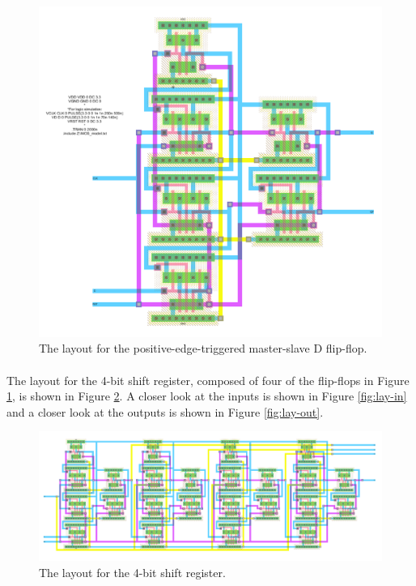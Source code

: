 \documentclass{article}
\begin{document}
  \begin{figure}[H]
    \centering
    \includegraphics[width=\linewidth, frame]{screenshots/d-ff-lay.png}
    \caption{The layout for the positive-edge-triggered master-slave D flip-flop.}
    \label{fig:d-ff-lay}
  \end{figure}

  \paragraph{}
  The layout for the 4-bit shift register, composed of four of the flip-flops in Figure \ref{fig:d-ff-lay}, is shown in Figure \ref{fig:lay}. A closer look at the inputs is shown in Figure \ref{fig:lay-in} and a closer look at the outputs is shown in Figure \ref{fig:lay-out}.

  \begin{figure}[H]
    \centering
    \includegraphics[width=\linewidth, frame]{screenshots/lay.png}
    \caption{The layout for the 4-bit shift register.}
    \label{fig:lay}
  \end{figure}
\end{document}
